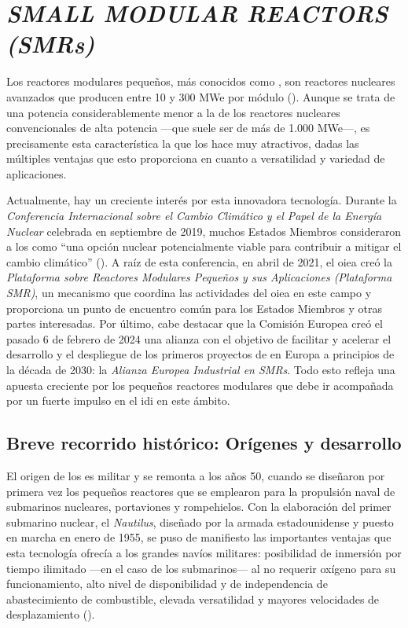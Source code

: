 \newpage
\section{\emph{SMALL MODULAR REACTORS (SMRs)}} \label{small_modular_reactors}

Los reactores modulares pequeños, más conocidos como , son reactores nucleares avanzados que producen entre 10 y 300 MWe por módulo (\cite{nea_smrs_2021}). Aunque se trata de una potencia considerablemente menor a la de los reactores nucleares convencionales de alta potencia ---que suele ser de más de 1.000 MWe---, es precisamente esta característica la que los hace muy atractivos, dadas las múltiples ventajas que esto proporciona en cuanto a versatilidad y variedad de aplicaciones.

Actualmente, hay un creciente interés por esta innovadora tecnología. Durante la \emph{Conferencia Internacional sobre el Cambio Climático y el Papel de la Energía Nuclear} celebrada en septiembre de 2019, muchos Estados Miembros consideraron a los  como ``una opción nuclear potencialmente viable para contribuir a mitigar el cambio climático'' (\cite{oiea_informe_2019}). A raíz de esta conferencia, en abril de 2021, el \acrfull{oiea} creó la \emph{Plataforma sobre Reactores Modulares Pequeños y sus Aplicaciones (Plataforma SMR)}, un mecanismo que coordina las actividades del \acrshort{oiea} en este campo y proporciona un punto de encuentro común para los Estados Miembros y otras partes interesadas. Por último, cabe destacar que la Comisión Europea creó el pasado 6 de febrero de 2024 una alianza con el objetivo de facilitar y acelerar el desarrollo y el despliegue de los primeros proyectos de  en Europa a principios de la década de 2030: la \emph{Alianza Europea Industrial en SMRs}. Todo esto refleja una apuesta creciente por los pequeños reactores modulares que debe ir acompañada por un fuerte impulso en el \acrshort{idi} en este ámbito.

\subsection{Breve recorrido histórico: Orígenes y desarrollo}

El origen de los  es militar y se remonta a los años 50, cuando se diseñaron por primera vez los pequeños reactores que se emplearon para la propulsión naval de submarinos nucleares, portaviones y rompehielos. Con la elaboración del primer submarino nuclear, el \emph{Nautilus}, diseñado por la armada estadounidense y puesto en marcha en enero de 1955, se puso de manifiesto las importantes ventajas que esta tecnología ofrecía a los grandes navíos militares: posibilidad de inmersión por tiempo ilimitado ---en el caso de los submarinos--- al no requerir oxígeno para su funcionamiento, alto nivel de disponibilidad y de independencia de abastecimiento de combustible, elevada versatilidad y mayores velocidades de desplazamiento (\cite{propulsion_naval_nuclear}).

